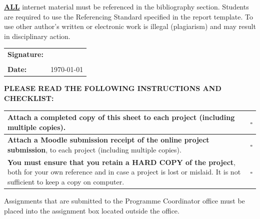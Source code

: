 \underline {\textbf{ALL}} internet material must be referenced in the bibliography section. Students are required to use the Referencing Standard specified in the report template. To use other author's written or electronic work is illegal (plagiarism) and may result in disciplinary action.

\begin{table}[!h]
\begin{center}
\small
\begin{tabular}{||p{}|p{}||}
	\hline
	\textbf{Signature:} &        \\
	                    &        \\ \hline
	\textbf{Date:}      & \today \\ \hline
\end{tabular}
\end{center}
\end{table}

\vspace{-.5cm}
\noindent \textbf{PLEASE READ THE FOLLOWING INSTRUCTIONS AND CHECKLIST:}\\
\vspace{-.5cm}

\begin{table}[!h]
\begin{center}
\small
\begin{tabular}{||p{}|p{}||}
	\hline
	Attach a completed copy of this sheet to each project (including multiple copies).                                                                                                           & $\square$ \\ \hline
	\textbf{Attach a Moodle submission receipt of the online project submission}, to each project (including multiple copies).                                                                   & $\square$ \\ \hline
	\textbf{You must ensure that you retain a HARD COPY of the project}, both for your own reference and in case a project is lost or mislaid. It is not sufficient to keep a copy on computer. & $\square$ \\ \hline
\end{tabular}
\end{center}
\end{table}
\vspace{-.5cm}

Assignments that are submitted to the Programme Coordinator office must be placed into the assignment box located outside the office.


